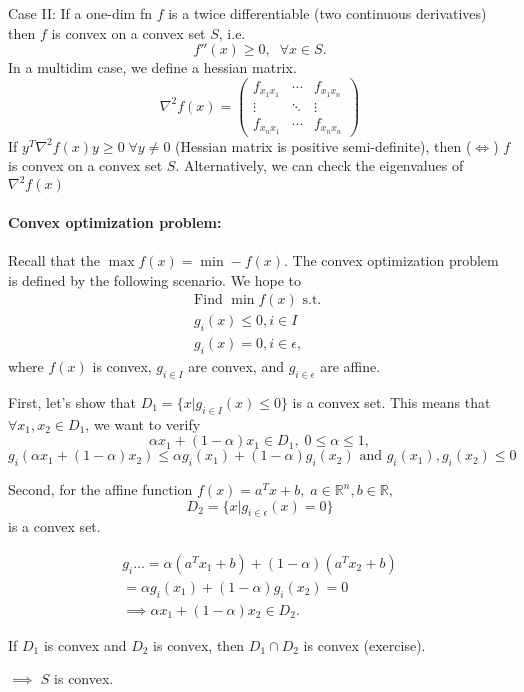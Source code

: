 Case II: If a one-dim fn $f$ is a twice differentiable (two continuous derivatives) then $f$ is convex on a convex set $S$, i.e.
\[f''(x) \geq 0, \;\; \forall x\in S.\]
In a multidim case, we define a hessian matrix.
\[ \nabla ^2 f(x) = \begin{pmatrix}
f_{x_1x_1} & \cdots & f_{x_1x_n} \\
\vdots & \ddots & \vdots \\
f_{x_nx_1} & \cdots & f_{x_nx_n}
\end{pmatrix} \]
If $y^T\nabla^2 f(x) y \geq 0 \; \forall y \neq 0$ (Hessian matrix is positive semi-definite), then ($\iff$) $f$ is convex on a convex set $S$. Alternatively, we can check the eigenvalues of $\nabla^2 f(x)$

\paragraph*{Convex optimization problem: }Recall that the $\max f(x) = \min - f(x)$. The convex optimization problem is defined by the following scenario. We hope to
\[\begin{aligned}
\text{Find $\min f(x)$ s.t. }\\
g_i(x) \leq 0 , i\in I \\
g_i(x) = 0, i\in \epsilon ,
\end{aligned}\]
where $f(x)$ is convex, $g_{i\in I}$ are convex, and $g_{i\in \epsilon}$ are affine.

First, let's show that $D_1 = \{ x | g_{i\in I}(x) \leq 0 \}$ is a convex set. This means that $\forall x_1, x_2 \in D_1$, we want to verify \[\alpha x_1 + (1-\alpha) x_1 \in D_1, \; 0\leq \alpha \leq 1,\]
\[g_i(\alpha x_1 + (1-\alpha) x_2 ) \leq \alpha g_i(x_1) + (1-\alpha) g_i(x_2)\text{ and }g_i(x_1), g_i(x_2) \leq 0 \]

Second, for the affine function $f(x) = a^Tx + b, \; a\in \mathbb{R}^n, b\in \mathbb{R}$,
\[D_2 = \{ x| g_{i\in \epsilon}(x) = 0  \} \] is a convex set.

\[\begin{aligned}
g_i ...
= \alpha (a^T x_1 + b ) + (1-\alpha) (a^Tx_2 + b) \\
= \alpha g_i(x_1) + (1-\alpha) g_i(x_2) = 0 \\
\implies \alpha x_1 + (1-\alpha) x_2 \in D_2.
\end{aligned}\]

If $D_1$ is convex and $D_2$ is convex, then $D_1 \cap D_2$ is convex (exercise).

$\implies$ $S$ is convex.

